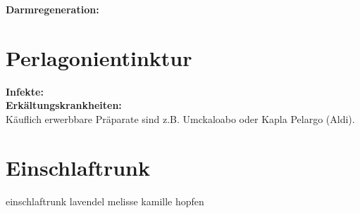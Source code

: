 
\textbf{Darmregeneration:} \\ 





\newpage


\section{Perlagonientinktur}
\label{   }


 


\textbf{Infekte:} \\ 

\textbf{Erkältungskrankheiten:} \\ 

Käuflich erwerbbare Präparate sind z.B. Umckaloabo oder Kapla Pelargo (Aldi).




\section{Einschlaftrunk}
\label{   }

einschlaftrunk
lavendel
melisse
kamille
hopfen
